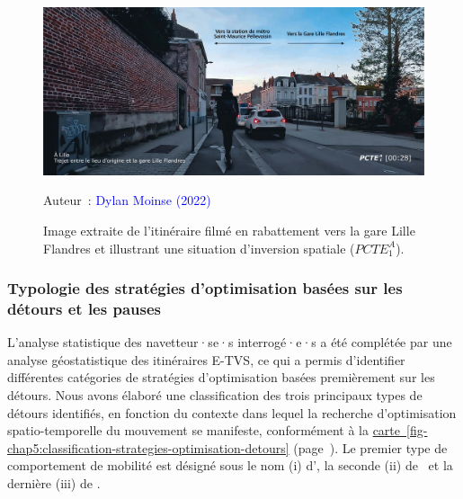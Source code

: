 \begin{refsegment}
    \begin{figure}[h!]\vspace*{4pt}
        \caption{Image extraite de l'itinéraire filmé en rabattement vers la gare Lille Flandres et illustrant une situation d'inversion spatiale (\(PCTE^{A}_{1}\)).}
        \label{fig-chap5:pcte1a-inversion-spatiale}
        \centerline{\includegraphics[width=1\columnwidth]{src/Figures/Chap-5/FR_Detours_PCTE1_Access_1.jpg}}
        \vspace{5pt}
        \begin{flushright}\scriptsize{
        Auteur~: \textcolor{blue}{Dylan Moinse (2022)}
        }\end{flushright}
    \end{figure}

\subsubsection*{Typologie des stratégies d'optimisation basées sur les détours et les pauses
    \label{chap5:typologie-strategies-optimisation}
    }
 
L'analyse statistique des navetteur·se·s interrogé·e·s a été complétée par une analyse géostatistique des itinéraires \acrshort{E-TVS}, ce qui a permis d'identifier différentes catégories de stratégies d'optimisation basées premièrement sur les détours. Nous avons élaboré une classification des trois principaux types de détours identifiés, en fonction du contexte dans lequel la recherche d'optimisation spatio-temporelle du mouvement se manifeste, conformément à la \hyperref[fig-chap5:classification-strategies-optimisation-detours]{carte~\ref{fig-chap5:classification-strategies-optimisation-detours}} (page~\pageref{fig-chap5:classification-strategies-optimisation-detours}). Le premier type de comportement de mobilité est désigné sous le nom (i) d', la seconde (ii) de ~et la dernière (iii) de .%


\end{refsegment}
